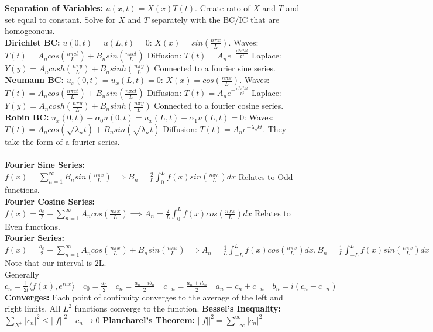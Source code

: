 \documentclass[answers,12pt,addpoints]{exam}
\begin{document}
\textbf{Separation of Variables:} $u(x,t) = X(x)T(t)$. Create rato of $X$ and $T$ and set equal to constant. Solve for $X$ and $T$ separately with the BC/IC that are homogeonous.\\
\textbf{Dirichlet BC:} $u(0,t) = u(L,t) = 0$: $X(x) = sin(\frac{n\pi x}{L})$. Waves: $T(t) = A_n cos(\frac{n\pi c t}{L}) + B_n sin(\frac{n\pi c t}{L})$ Diffusion: $T(t) = A_n e^{-\frac{n^2\pi^2 kt}{L^2}}$ Laplace: $Y(y) = A_n cosh(\frac{n\pi y}{L}) + B_n sinh(\frac{n\pi y}{L})$ Connected to a fourier sine series.\\
\textbf{Neumann BC:} $u_x(0,t) = u_x(L,t) = 0$: $X(x) = cos(\frac{n\pi x}{L})$. Waves: $T(t) = A_n cos(\frac{n\pi c t}{L}) + B_n sin(\frac{n\pi c t}{L})$ Diffusion: $T(t) = A_n e^{-\frac{n^2\pi^2 kt}{L^2}}$ Laplace: $Y(y) = A_n cosh(\frac{n\pi y}{L}) + B_n sinh(\frac{n\pi y}{L})$ Connected to a fourier cosine series.\\
\textbf{Robin BC:} $u_x(0,t) - \alpha_0 u(0,t) = u_x(L,t) + \alpha_1 u(L,t) = 0$: Waves: $T(t) = A_n cos(\sqrt{\lambda_n}t) + B_n sin(\sqrt{\lambda_n}t)$ Diffusion: $T(t) = A_n e^{-\lambda_n kt}$. They take the form of a fourier series. \\\\
\textbf{Fourier Sine Series:} $f(x) = \sum_{n=1}^{\infty} B_n sin(\frac{n\pi x}{L}) \implies B_n = \frac{2}{L} \int_{0}^{L} f(x)sin(\frac{nx\pi}{L})dx$ Relates to Odd functions.\\
\textbf{Fourier Cosine Series:} $f(x) = \frac{a_0}{2} + \sum_{n=1}^{\infty} A_n cos(\frac{n\pi x}{L}) \implies A_n = \frac{2}{L} \int_{0}^{L} f(x)cos(\frac{nx\pi}{L})dx$ Relates to Even functions.\\
\textbf{Fourier Series:} $f(x) = \frac{a_0}{2} + \sum_{n=1}^{\infty} A_n cos(\frac{n\pi x}{L}) + B_n sin(\frac{n\pi x}{L}) \implies A_n = \frac{1}{L} \int_{-L}^{L} f(x)cos(\frac{n\pi x}{L})dx, B_n = \frac{1}{L} \int_{-L}^{L} f(x)sin(\frac{n\pi x}{L})dx$ Note that our interval is 2L.\\
Generally $c_n = \frac{1}{2l} \langle f(x), e^{inx} \rangle \quad c_0 = \frac{a_0}{2} \quad c_n = \frac{a_n - ib_n}{2} \quad c_{-n} = \frac{a_n + ib_n}{2} \quad a_n = c_n + c_{-n} \quad b_n = i(c_n - c_{-n})$\\
\textbf{Converges:} Each point of continuity converges to the average of the left and right limits. All $L^2$ functions converge to the function. \textbf{Bessel's Inequality:} $\sum_{N^+} |c_n|^2 \leq ||f||^2 \quad c_n \to 0$ \textbf{Plancharel's Theorem:} $||f||^2 = \sum_{-\infty}^{\infty} |c_n|^2$\\\\
\end{document}
